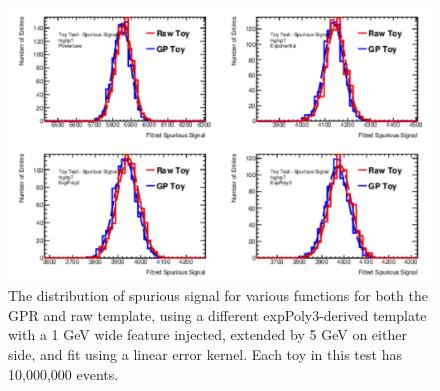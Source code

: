 \begin{figure} 
\begin{center}
  \includegraphics[width=\textwidth]{figures/background/gpr/validation/linear/ToyTest_FitSigVals_highpT_10M_Sig_1s}   
\caption{The distribution of spurious signal for various functions for both the GPR and raw template, using a different expPoly3-derived template with a 1 GeV wide feature injected, extended by 5 GeV on either side, and fit using a linear error kernel. Each toy in this test has 10,000,000 events.}
\label{fig:linearkernel_highpt_10M_Sig_1s}
\end{center}
\end{figure}

